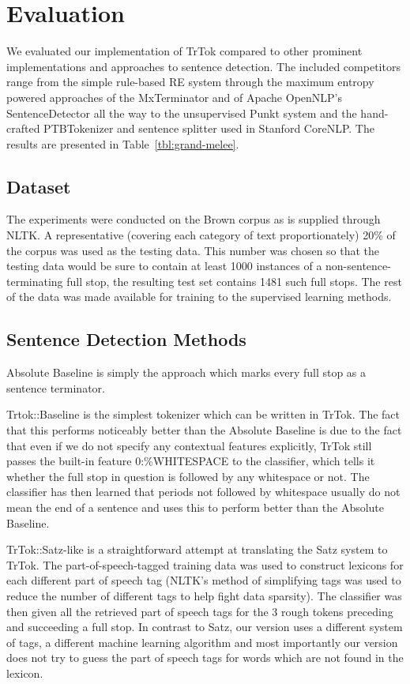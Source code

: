 \section{Evaluation}
\label{sec:eval}

We evaluated our implementation of TrTok compared to other prominent
implementations and approaches to sentence detection. The included
competitors range from the simple rule-based RE system through the
maximum entropy powered approaches of the MxTerminator and of Apache
OpenNLP's SentenceDetector all the way to the unsupervised Punkt
system and the hand-crafted PTBTokenizer and sentence splitter used in
Stanford CoreNLP. The results are presented in
Table~\ref{tbl:grand-melee}.

\subsection{Dataset}

The experiments were conducted on the Brown corpus as is supplied
through NLTK. A representative (covering each category of text
proportionately) 20\% of the corpus was used as the testing data. This
number was chosen so that the testing data would be sure to contain at
least 1000 instances of a non-sentence-terminating full stop, the
resulting test set contains 1481 such full stops. The rest of the data
was made available for training to the supervised learning methods.

\subsection{Sentence Detection Methods}

Absolute Baseline is simply the approach which marks every full stop as
a sentence terminator.

Trtok::Baseline is the simplest tokenizer which can be written in
TrTok. The fact that this performs noticeably better than the Absolute
Baseline is due to the fact that even if we do not specify any
contextual features explicitly, TrTok still passes the built-in
feature 0:\%WHITESPACE to the classifier, which tells it whether the
full stop in question is followed by any whitespace or not. The
classifier has then learned that periods not followed by whitespace
usually do not mean the end of a sentence and uses this to perform
better than the Absolute Baseline.

TrTok::Satz-like is a straightforward attempt at translating the Satz
system to TrTok. The part-of-speech-tagged training data was used to
construct lexicons for each different part of speech tag (NLTK's
method of simplifying tags was used to reduce the number of different
tags to help fight data sparsity). The classifier was then given all
the retrieved part of speech tags for the 3 rough tokens preceding and
succeeding a full stop. In contrast to Satz, our version uses a
different system of tags, a different machine learning algorithm and
most importantly our version does not try to guess the part of speech
tags for words which are not found in the lexicon.

